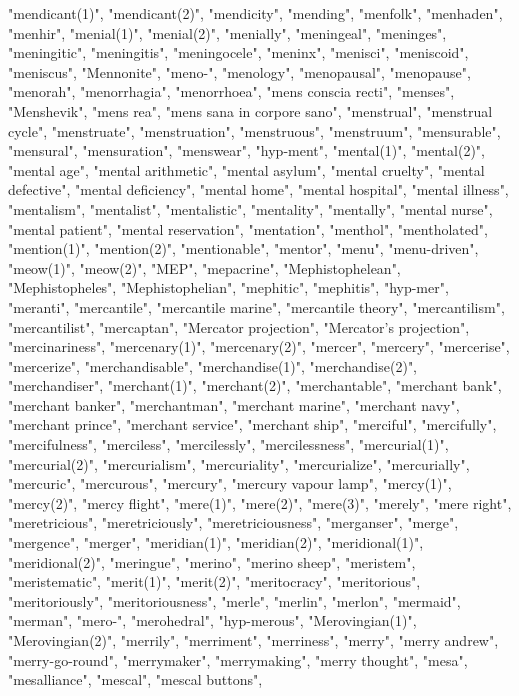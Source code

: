 "mendicant(1)",
"mendicant(2)",
"mendicity",
"mending",
"menfolk",
"menhaden",
"menhir",
"menial(1)",
"menial(2)",
"menially",
"meningeal",
"meninges",
"meningitic",
"meningitis",
"meningocele",
"meninx",
"menisci",
"meniscoid",
"meniscus",
"Mennonite",
"meno-",
"menology",
"menopausal",
"menopause",
"menorah",
"menorrhagia",
"menorrhoea",
"mens conscia recti",
"menses",
"Menshevik",
"mens rea",
"mens sana in corpore sano",
"menstrual",
"menstrual cycle",
"menstruate",
"menstruation",
"menstruous",
"menstruum",
"mensurable",
"mensural",
"mensuration",
"menswear",
"hyp-ment",
"mental(1)",
"mental(2)",
"mental age",
"mental arithmetic",
"mental asylum",
"mental cruelty",
"mental defective",
"mental deficiency",
"mental home",
"mental hospital",
"mental illness",
"mentalism",
"mentalist",
"mentalistic",
"mentality",
"mentally",
"mental nurse",
"mental patient",
"mental reservation",
"mentation",
"menthol",
"mentholated",
"mention(1)",
"mention(2)",
"mentionable",
"mentor",
"menu",
"menu-driven",
"meow(1)",
"meow(2)",
"MEP",
"mepacrine",
"Mephistophelean",
"Mephistopheles",
"Mephistophelian",
"mephitic",
"mephitis",
"hyp-mer",
"meranti",
"mercantile",
"mercantile marine",
"mercantile theory",
"mercantilism",
"mercantilist",
"mercaptan",
"Mercator projection",
"Mercator's projection",
"mercinariness",
"mercenary(1)",
"mercenary(2)",
"mercer",
"mercery",
"mercerise",
"mercerize",
"merchandisable",
"merchandise(1)",
"merchandise(2)",
"merchandiser",
"merchant(1)",
"merchant(2)",
"merchantable",
"merchant bank",
"merchant banker",
"merchantman",
"merchant marine",
"merchant navy",
"merchant prince",
"merchant service",
"merchant ship",
"merciful",
"mercifully",
"mercifulness",
"merciless",
"mercilessly",
"mercilessness",
"mercurial(1)",
"mercurial(2)",
"mercurialism",
"mercuriality",
"mercurialize",
"mercurially",
"mercuric",
"mercurous",
"mercury",
"mercury vapour lamp",
"mercy(1)",
"mercy(2)",
"mercy flight",
"mere(1)",
"mere(2)",
"mere(3)",
"merely",
"mere right",
"meretricious",
"meretriciously",
"meretriciousness",
"merganser",
"merge",
"mergence",
"merger",
"meridian(1)",
"meridian(2)",
"meridional(1)",
"meridional(2)",
"meringue",
"merino",
"merino sheep",
"meristem",
"meristematic",
"merit(1)",
"merit(2)",
"meritocracy",
"meritorious",
"meritoriously",
"meritoriousness",
"merle",
"merlin",
"merlon",
"mermaid",
"merman",
"mero-",
"merohedral",
"hyp-merous",
"Merovingian(1)",
"Merovingian(2)",
"merrily",
"merriment",
"merriness",
"merry",
"merry andrew",
"merry-go-round",
"merrymaker",
"merrymaking",
"merry thought",
"mesa",
"mesalliance",
"mescal",
"mescal buttons",
